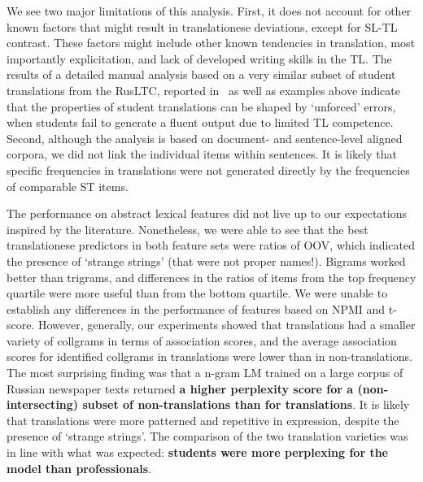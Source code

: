 We see two major limitations of this analysis. First, it does not account for other known factors that might result in translationese deviations, except for SL-TL contrast. These factors might include other known tendencies in translation, most importantly explicitation, and lack of developed writing skills in the TL. The results of a detailed manual analysis based on a very similar subset of student translations from the RusLTC, reported in~\citet{Kunilovskaya2022err} as well as examples above indicate that the properties of student translations can be shaped by `unforced' errors, when students fail to generate a fluent output due to limited TL competence.  
Second, although the analysis is based on document- and sentence-level aligned corpora, we did not link the individual items within sentences. It is likely that specific frequencies in translations were not generated directly by the frequencies of comparable ST items.

The performance on abstract lexical features did not live up to our expectations inspired by the literature. Nonetheless, we were able to see that the best translationese predictors in both feature sets were ratios of OOV, which indicated the presence of `strange strings' (that were not proper names!). Bigrams worked better than trigrams, and differences in the ratios of items from the top frequency quartile were more useful than from the bottom quartile. We were unable to establish any differences in the performance of features based on NPMI and t-score. However, generally, our experiments showed that translations had a smaller variety of collgrams in terms of association scores, and the average association scores for identified collgrams in translations were lower than in non-translations.
The most surprising finding was that a n-gram LM trained on a large corpus of Russian newspaper texts returned \textbf{a higher perplexity score for a (non-intersecting) subset of non-translations than for translations}. It is likely that translations were more patterned and repetitive in expression, despite the presence of `strange strings'. The comparison of the two translation varieties was in line with what was expected: \textbf{students were more perplexing for the model than professionals}. 
